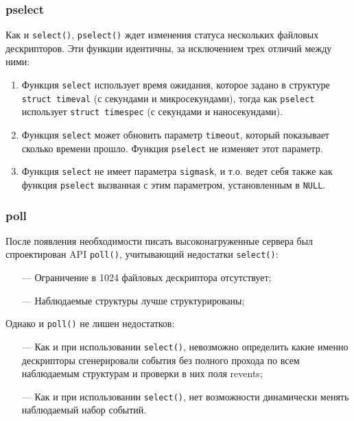 \subsubsection{pselect}

Как и \texttt{select()}, \texttt{pselect()} ждет изменения статуса нескольких файловых дескрипторов. Эти функции идентичны, за исключением трех отличий между ними:

\begin{enumerate}
	\item Функция \texttt{select} использует время ожидания, которое задано в структуре \texttt{struct timeval} (с секундами и микросекундами), тогда как \texttt{pselect} использует \texttt{struct timespec} (с секундами и наносекундами).
	
	\item Функция \texttt{select} может обновить параметр \texttt{timeout}, который показывает сколько времени прошло. Функция \texttt{pselect} не изменяет этот параметр.
	
	\item Функция \texttt{select} не имеет параметра \texttt{sigmask}, и т.о. ведет себя также как функция \texttt{pselect} вызванная с этим параметром, установленным в \texttt{NULL}.
\end{enumerate}

\subsubsection{poll}

После появления необходимости писать высоконагруженные сервера был спроектирован API \texttt{poll()}, учитывающий недостатки \texttt{select()}:

\begin{itemize}
	\item[---] Ограничение в 1024 файловых дескриптора отсутствует;
	
	\item[---] Наблюдаемые структуры лучше структурированы;	
\end{itemize}

Однако и \texttt{poll()} не лишен недостатков:

\begin{itemize}
	\item[---] Как и при использовании \texttt{select()}, невозможно определить какие именно дескрипторы сгенерировали события без полного прохода по всем наблюдаемым структурам и проверки в них поля revents;
	
	\item[---] Как и при использовании \texttt{select()}, нет возможности динамически менять наблюдаемый набор событий.
\end{itemize}

